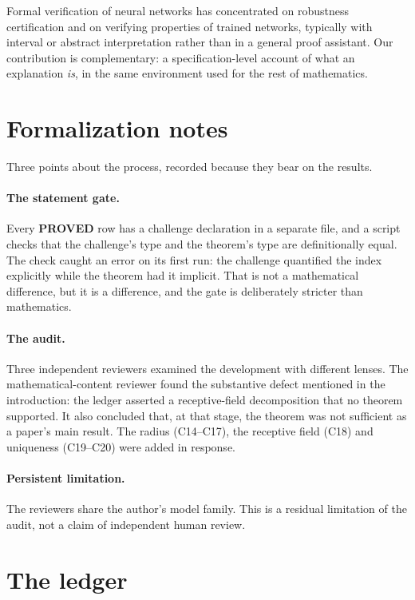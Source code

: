 \documentclass[11pt]{article}
\newcommand{\claim}[1]{\textbf{#1}}
\begin{document}
Formal verification of neural networks has concentrated on robustness
certification and on verifying properties of trained networks, typically with
interval or abstract interpretation rather than in a general proof assistant.
Our contribution is complementary: a specification-level account of what an
explanation \emph{is}, in the same environment used for the rest of
mathematics.

\section{Formalization notes}\label{sec:earlier}

Three points about the process, recorded because they bear on the results.

\paragraph{The statement gate.} Every \claim{PROVED} row has a challenge
declaration in a separate file, and a script checks that the challenge's type
and the theorem's type are definitionally equal. The check caught an error on
its first run: the challenge quantified the index explicitly while the theorem
had it implicit. That is not a mathematical difference, but it is a difference,
and the gate is deliberately stricter than mathematics.

\paragraph{The audit.} Three independent reviewers examined the development
with different lenses. The mathematical-content reviewer found the substantive
defect mentioned in the introduction: the ledger asserted a receptive-field
decomposition that no theorem supported. It also concluded that, at that stage,
the theorem was not sufficient as a paper's main result. The radius (C14--C17),
the receptive field (C18) and uniqueness (C19--C20) were added in response.

\paragraph{Persistent limitation.} The reviewers share the author's model
family. This is a residual limitation of the audit, not a claim of independent
human review.

\appendix

\section{The ledger}
\end{document}
